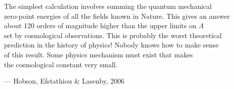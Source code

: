 \begin{flushright}
\begin{hangleftquote}{\QENOpen}{\QENClose}
The simplest calculation involves summing the quantum mechanical\\
zero-point energies of all the fields known in Nature. This gives an answer\\
about 120 orders of magnitude higher than the upper limits on \(\Lambda\)\\
set by cosmological observations. This is probably the worst theoretical\\
prediction in the history of physics! Nobody knows how to make sense\\
of this result. Some physics mechanism must exist that makes\\
the cosmological constant very small.
\end{hangleftquote}
\par\smallskip
\normalfont — Hobson, Efstathiou \& Lasenby, 2006
\end{flushright}
